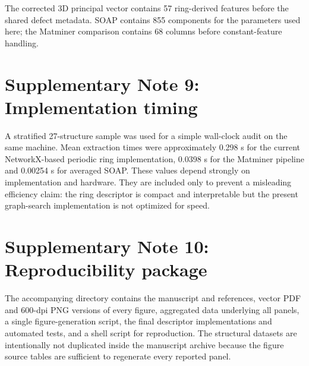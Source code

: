 \documentclass[11pt]{article}
\begin{document}
The corrected 3D principal vector contains 57 ring-derived features before the shared defect metadata. SOAP contains 855 components for the parameters used here; the Matminer comparison contains 68 columns before constant-feature handling.

\section*{Supplementary Note 9: Implementation timing}

A stratified 27-structure sample was used for a simple wall-clock audit on the same machine. Mean extraction times were approximately 0.298 s for the current NetworkX-based periodic ring implementation, 0.0398 s for the Matminer pipeline and 0.00254 s for averaged SOAP. These values depend strongly on implementation and hardware. They are included only to prevent a misleading efficiency claim: the ring descriptor is compact and interpretable but the present graph-search implementation is not optimized for speed.

\section*{Supplementary Note 10: Reproducibility package}

The accompanying directory contains the manuscript and references, vector PDF and 600-dpi PNG versions of every figure, aggregated data underlying all panels, a single figure-generation script, the final descriptor implementations and automated tests, and a shell script for reproduction. The structural datasets are intentionally not duplicated inside the manuscript archive because the figure source tables are sufficient to regenerate every reported panel.
\end{document}
